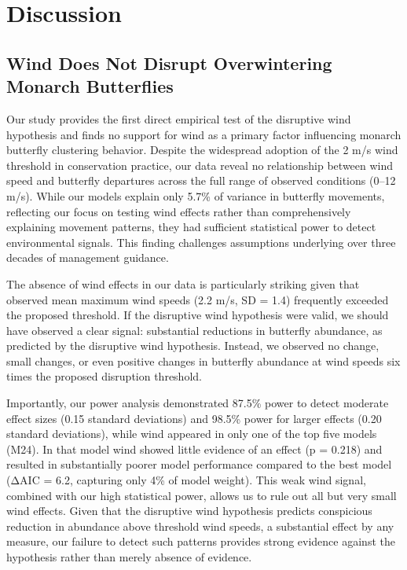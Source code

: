 \section{Discussion}

\subsection{Wind Does Not Disrupt Overwintering Monarch Butterflies}

Our study provides the first direct empirical test of the disruptive wind hypothesis and finds no support for wind as a primary factor influencing monarch butterfly clustering behavior. Despite the widespread adoption of the 2 m/s wind threshold in conservation practice, our data reveal no relationship between wind speed and butterfly departures across the full range of observed conditions (0--12 m/s). While our models explain only 5.7\% of variance in butterfly movements, reflecting our focus on testing wind effects rather than comprehensively explaining movement patterns, they had sufficient statistical power to detect environmental signals. This finding challenges assumptions underlying over three decades of management guidance.

The absence of wind effects in our data is particularly striking given that observed mean maximum wind speeds (2.2 m/s, SD = 1.4) frequently exceeded the proposed threshold. If the disruptive wind hypothesis were valid, we should have observed a clear signal: substantial reductions in butterfly abundance, as predicted by the disruptive wind hypothesis. Instead, we observed no change, small changes, or even positive changes in butterfly abundance at wind speeds six times the proposed disruption threshold. 

Importantly, our power analysis demonstrated 87.5\% power to detect moderate effect sizes (0.15 standard deviations) and 98.5\% power for larger effects (0.20 standard deviations), while wind appeared in only one of the top five models (M24). In that model wind showed little evidence of an effect (p = 0.218) and resulted in substantially poorer model performance compared to the best model (ΔAIC = 6.2, capturing only 4\% of model weight). This weak wind signal, combined with our high statistical power, allows us to rule out all but very small wind effects. Given that the disruptive wind hypothesis predicts conspicious reduction in abundance above threshold wind speeds, a substantial effect by any measure, our failure to detect such patterns provides strong evidence against the hypothesis rather than merely absence of evidence.

